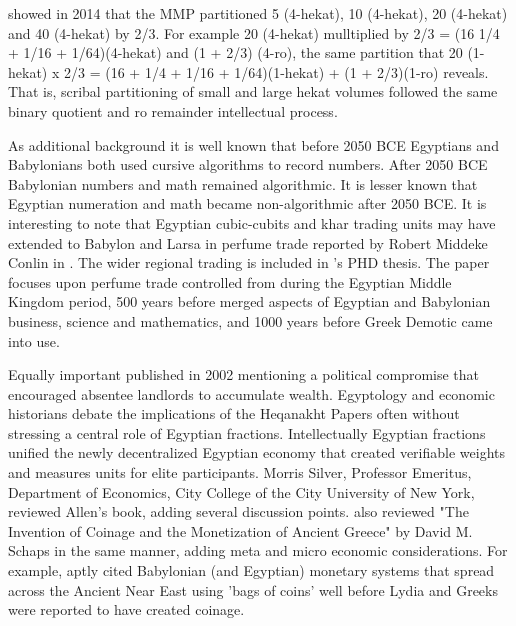 \documentclass[12pt]{article}
\begin{document}
 showed in 2014 that the MMP partitioned 5 (4-hekat), 10 (4-hekat), 20 (4-hekat) and 40 (4-hekat) by 2/3. For example 20 (4-hekat) mulltiplied by 2/3 = (16 1/4 + 1/16 + 1/64)(4-hekat) and (1 + 2/3) (4-ro), the same partition  that 20 (1-hekat) x 2/3 = (16 + 1/4 + 1/16 + 1/64)(1-hekat) + (1 + 2/3)(1-ro) reveals. That is, scribal partitioning of small and large hekat volumes followed the same binary quotient and ro remainder intellectual process.

As additional background it is well known that before 2050 BCE Egyptians and Babylonians both used cursive algorithms to record numbers. After 2050 BCE Babylonian numbers and math remained algorithmic. It is lesser known that Egyptian numeration and math became non-algorithmic after 2050 BCE. It is interesting to note that Egyptian cubic-cubits and khar trading units may have extended to Babylon and Larsa in perfume trade reported by Robert Middeke Conlin in . The wider regional trading is included in 's PHD thesis. The paper focuses upon perfume trade controlled from  during the Egyptian Middle Kingdom period, 500 years before  merged aspects of Egyptian and Babylonian business, science and mathematics, and 1000 years before Greek Demotic came into use.

Equally important  published in 2002 
 mentioning a political compromise that encouraged absentee landlords to accumulate wealth. Egyptology and economic historians debate the implications of the Heqanakht Papers often without stressing a central role of Egyptian fractions. Intellectually Egyptian fractions unified the newly decentralized Egyptian economy that created verifiable weights and measures units for elite participants. Morris Silver, Professor Emeritus, Department of Economics, City College of the City University of New York, reviewed Allen's book, adding several discussion points.  also reviewed "The Invention of Coinage and the Monetization of Ancient Greece" by David M. Schaps in the same manner, adding meta and micro economic considerations. For example,  aptly cited Babylonian (and Egyptian) monetary systems that spread across the Ancient Near East using 'bags of coins' well before Lydia and Greeks were reported to have created coinage.
\end{document}
